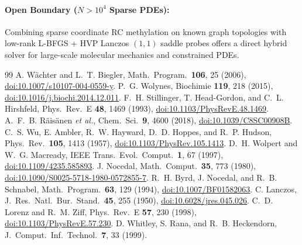 \documentclass[10pt,twocolumn,letterpaper]{article}
\begin{document}
\paragraph{Open Boundary ($N > 10^4$ Sparse PDEs):} Combining sparse coordinate RC methylation on known graph topologies with low-rank L-BFGS + HVP Lanczos $(1,1)$ saddle probes offers a direct hybrid solver for large-scale molecular mechanics and constrained PDEs.

\begin{thebibliography}{99}\setlength{\itemsep}{1pt}\footnotesize
{} A. W\"achter and L.~T. Biegler, Math.\ Program.\ \textbf{106}, 25 (2006), \href{https://doi.org/10.1007/s10107-004-0559-y}{doi:10.1007/s10107-004-0559-y}.
 P.~G. Wolynes, Biochimie \textbf{119}, 218 (2015), \href{https://doi.org/10.1016/j.biochi.2014.12.011}{doi:10.1016/j.biochi.2014.12.011}.
 F.~H. Stillinger, T. Head-Gordon, and C.~L. Hirshfeld, Phys.\ Rev.\ E \textbf{48}, 1469 (1993), \href{https://doi.org/10.1103/PhysRevE.48.1469}{doi:10.1103/PhysRevE.48.1469}.
 A.~F.~B. R\"ais\"anen \emph{et al.}, Chem.\ Sci.\ \textbf{9}, 4600 (2018), \href{https://doi.org/10.1039/C8SC00908B}{doi:10.1039/C8SC00908B}.
 C.~S. Wu, E. Ambler, R.~W. Hayward, D.~D. Hoppes, and R.~P. Hudson, Phys.\ Rev.\ \textbf{105}, 1413 (1957), \href{https://doi.org/10.1103/PhysRev.105.1413}{doi:10.1103/PhysRev.105.1413}.
 D.~H. Wolpert and W.~G. Macready, IEEE Trans.\ Evol.\ Comput.\ \textbf{1}, 67 (1997), \href{https://doi.org/10.1109/4235.585893}{doi:10.1109/4235.585893}.
 J. Nocedal, Math.\ Comput.\ \textbf{35}, 773 (1980), \href{https://doi.org/10.1090/S0025-5718-1980-0572855-7}{doi:10.1090/S0025-5718-1980-0572855-7}.
 R.~H. Byrd, J. Nocedal, and R.~B. Schnabel, Math.\ Program.\ \textbf{63}, 129 (1994), \href{https://doi.org/10.1007/BF01582063}{doi:10.1007/BF01582063}.
 C. Lanczos, J.\ Res.\ Natl.\ Bur.\ Stand.\ \textbf{45}, 255 (1950), \href{https://doi.org/10.6028/jres.045.026}{doi:10.6028/jres.045.026}.
 C.~D. Lorenz and R.~M. Ziff, Phys.\ Rev.\ E \textbf{57}, 230 (1998), \href{https://doi.org/10.1103/PhysRevE.57.230}{doi:10.1103/PhysRevE.57.230}.
 D. Whitley, S. Rana, and R.~B. Heckendorn, J.\ Comput.\ Inf.\ Technol.\ \textbf{7}, 33 (1999).
\end{thebibliography}
\end{document}
